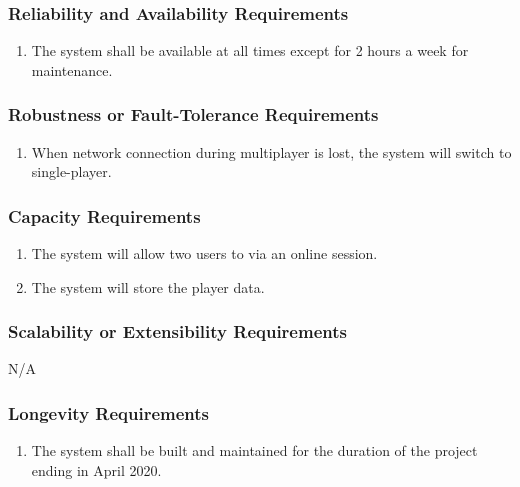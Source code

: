 \documentclass[]{article}
\begin{document}
\subsubsection{Reliability and Availability Requirements}
\label{ssub:reliability_and_availability_requirements}
\begin{enumerate}[start=3, label={PR\arabic*.}]
    \item The system shall be available at all times except for 2 hours a week 
    for maintenance.
\end{enumerate}

\subsubsection{Robustness or Fault-Tolerance Requirements}
\label{ssub:robustness_or_fault_tolerance_requirements}
\begin{enumerate}[start=4, label={PR\arabic*.}]
    \item When network connection during multiplayer is lost, the system will 
    switch to single-player.
\end{enumerate}

\subsubsection{Capacity Requirements}
\label{ssub:capacity_requirements}
\begin{enumerate}[start=5, label={PR\arabic*.}]
	\item The system will allow two users to via an online session.
	\item The system will store the player data.
\end{enumerate}

\subsubsection{Scalability or Extensibility Requirements}
\label{ssub:scalability_or_extensibility_requirements}
N/A

\subsubsection{Longevity Requirements}
\label{ssub:longevity_requirements}
\begin{enumerate}[start=7, label={PR\arabic*.}]
    \item The system shall be built and maintained for the duration of the 
    project ending in April 2020.
\end{enumerate}
\end{document}
